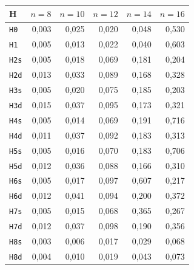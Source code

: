 \begin{tabular}{lrrrrr}
\toprule
H & $n=8$ & $n=10$ & $n=12$ & $n=14$ & $n=16$ \\
\midrule
\texttt{H0} & 0{,}003 & 0{,}025 & 0{,}020 & 0{,}048 & 0{,}530 \\
\texttt{H1} & 0{,}005 & 0{,}013 & 0{,}022 & 0{,}040 & 0{,}603 \\
\texttt{H2s} & 0{,}005 & 0{,}018 & 0{,}069 & 0{,}181 & 0{,}204 \\
\texttt{H2d} & 0{,}013 & 0{,}033 & 0{,}089 & 0{,}168 & 0{,}328 \\
\texttt{H3s} & 0{,}005 & 0{,}020 & 0{,}075 & 0{,}185 & 0{,}203 \\
\texttt{H3d} & 0{,}015 & 0{,}037 & 0{,}095 & 0{,}173 & 0{,}321 \\
\texttt{H4s} & 0{,}005 & 0{,}014 & 0{,}069 & 0{,}191 & 0{,}716 \\
\texttt{H4d} & 0{,}011 & 0{,}037 & 0{,}092 & 0{,}183 & 0{,}313 \\
\texttt{H5s} & 0{,}005 & 0{,}016 & 0{,}070 & 0{,}183 & 0{,}706 \\
\texttt{H5d} & 0{,}012 & 0{,}036 & 0{,}088 & 0{,}166 & 0{,}310 \\
\texttt{H6s} & 0{,}005 & 0{,}017 & 0{,}097 & 0{,}607 & 0{,}217 \\
\texttt{H6d} & 0{,}012 & 0{,}041 & 0{,}094 & 0{,}200 & 0{,}372 \\
\texttt{H7s} & 0{,}005 & 0{,}015 & 0{,}068 & 0{,}365 & 0{,}267 \\
\texttt{H7d} & 0{,}012 & 0{,}037 & 0{,}098 & 0{,}190 & 0{,}356 \\
\texttt{H8s} & 0{,}003 & 0{,}006 & 0{,}017 & 0{,}029 & 0{,}068 \\
\texttt{H8d} & 0{,}004 & 0{,}010 & 0{,}019 & 0{,}043 & 0{,}073 \\
\bottomrule
\end{tabular}
